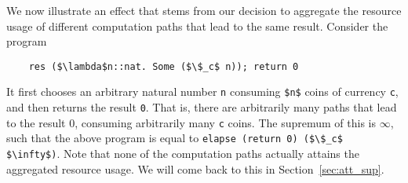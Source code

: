 \documentclass[acmsmall]{acmart}
\newcommand{\is}{\lstinline[language=isabelle]}
\begin{document}
\begin{example} \label{ex:inf}

We now illustrate an effect that stems from our decision to aggregate the resource usage of different computation paths that lead to the same result.
Consider the program
\begin{lstlisting}
    res ($\lambda$n::nat. Some ($\$_c$ n)); return 0
\end{lstlisting}
It first chooses an arbitrary natural number \is$n$ consuming \is{$n$} coins of currency \is{c}, and then returns the result \is$0$. 
That is, there are arbitrarily many paths that lead to the result $0$, consuming arbitrarily many \is$c$ coins. The supremum of this is $\infty$, such that the above program is equal to \is{elapse (return 0) ($\$_c$ $\infty$)}.
Note that none of the computation paths actually attains the aggregated resource usage.
We will come back to this in Section~\ref{sec:att_sup}.
\end{example}


\end{document}
